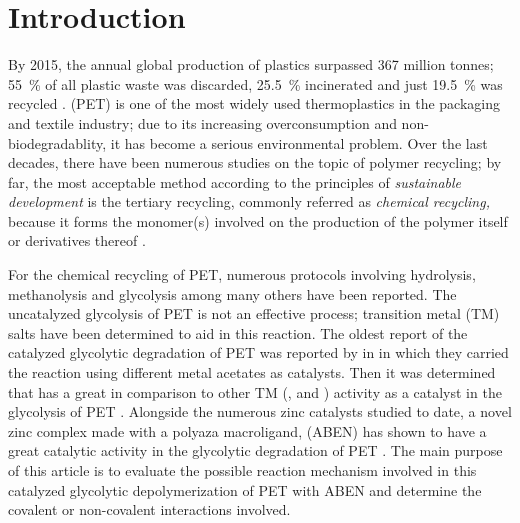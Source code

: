 \section{Introduction}

By 2015, the annual global production of plastics surpassed 367 million tonnes; \SI{55}{\percent} of all plastic waste was discarded, \SI{25.5}{\percent} incinerated and just \SI{19.5}{\percent} was recycled \cite{Geyer2017}.  (PET) is one of the most widely used thermoplastics in the packaging and textile industry; due to its increasing overconsumption and non-biodegradablity, it has become a serious environmental problem. 
Over the last decades, there have been numerous studies on the topic of polymer recycling; by far, the most acceptable method according to the principles of \emph{sustainable development} is the tertiary recycling, commonly referred as \emph{chemical recycling,} because it forms  the monomer(s) involved on the production of the polymer itself or derivatives thereof \cite{Bartolome2012}.

For the chemical recycling of PET, numerous protocols involving hydrolysis, methanolysis and glycolysis among many others \cite{Campanelli1993,Campanelli1994,Campanelli1994a} have been reported. The uncatalyzed glycolysis of PET is not an effective process; transition metal (TM) salts have been determined to aid in this reaction. The oldest report of the catalyzed glycolytic degradation of PET was reported by \citeauthor{Vaidya1988} in \citeyear{Vaidya1988} \cite{Vaidya1988} in which they carried the reaction using different metal acetates as catalysts. Then it was determined that  has a great in comparison to other TM (,  and ) activity as a catalyst in the glycolysis of PET \cite{Ghaemy2005}. Alongside the numerous zinc catalysts studied to date, a novel zinc complex made with a polyaza macroligand,  (ABEN) \cite{Elizondo-Martinez2013} has shown to have a great catalytic activity in the glycolytic degradation of PET \cite{Ovalle-Sanchez2017}. The main purpose of this article is to evaluate the possible reaction mechanism involved in this catalyzed glycolytic depolymerization of PET with ABEN and determine the covalent or non-covalent interactions involved.